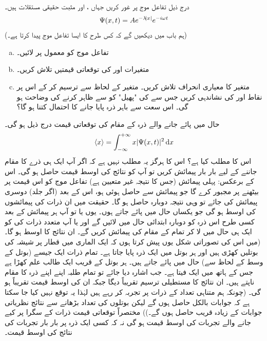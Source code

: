 درج ذیل تفاعل موج پر غور کریں جہاں ،  اور  مثبت حقیقی مستقلات ہیں۔
\begin{align*}
\Psi(x,t)=Ae^{-\lambda\abs{x}}e^{-i\omega t}
\end{align*}
(ہم باب  میں دیکھیں گے کہ کس طرح کا   ایسا تفاعل موج پیدا کرتا ہے۔)
\begin{enumerate}[a.]
\item
تفاعل موج  کو معمول پر لائیں۔
\item
متغیرات  اور  کی توقعاتی قیمتیں تلاش کریں۔
\item
متغیر  کا معیاری انحراف تلاش کریں۔ متغیر  کے لحاظ سے  ترسیم کر کے اس پر  نقاط  اور   کی نشاندہی کریں جس سے  کی "پھیل" کو  سے ظاہر کرنے  کی وضاحت ہو گی۔ اس سعت سے باہر ذرہ پایا جانے کا احتمال کتنا ہو گا؟
\end{enumerate}
 حال  میں پائے جانے والے ذرہ  کے مقام  کی توقعاتی قیمت درج ذیل ہو گی۔
\begin{align}\label{مساوات_تفاعل_موج_معیار_حرکت_توقعاتی_قیمت_تعریف}
\langle x\rangle=\int_{-\infty}^{+\infty}x|\Psi (x,t)|^{2}\dif{x}
\end{align}
اس کا مطلب کیا ہے؟ اس کا  ہرگز یہ مطلب نہیں ہے کہ اگر آپ ایک ہی ذرے کا مقام جاننے کے لیے بار بار پیمائش کریں تو آپ کو نتائج کی اوسط قیمت   حاصل ہو گی۔ اس کے برعکس: پہلی پیمائش (جس کا نتیجہ غیر متعیین ہے) تفاعل موج کو اس قیمت پر بیٹھنے پر مجبور کرے گا جو پیمائش سے حاصل ہوئی ہو، اس کے بعد (اگر جلد) دوسری پیمائش کی جائے تو وہی نتیجہ دوبارہ حاصل ہو گا۔ حقیقت میں 
 ان ذرات کی  پیمائشوں کی اوسط ہو گی جو یکساں حال  میں پائے جاتے ہوں۔ یوں یا تو آپ ہر پیمائش کے بعد کسی طرح اس ذرہ کو دوبارہ ابتدائی حال  میں لائیں گے اور یا آپ متعدد ذرات کی  کو ایک ہی حال   میں لا کر تمام کے مقام کی  پیمائش کریں گے۔ ان نتائج کا اوسط  ہو گا۔ (میں اس کی تصوراتی شکل یوں پیش کرتا ہوں کہ ایک الماری میں  قطار پر شیشہ کی بوتلیں کھڑی ہیں اور ہر بوتل میں ایک ذرہ پایا جاتا ہے۔ تمام ذرات ایک جیسے  (بوتل کے وسط کے لحاظ سے) حال  میں پائے جاتے ہیں۔ ہر بوتل کے قریب ایک طالب علم  کھڑا ہے جس کے ہاتھ میں ایک فیتا  ہے۔ جب اشارہ  دیا جائے تو تمام طلبہ اپنے اپنے ذرہ  کا مقام ناپتے ہیں۔ ان نتائج کا مستطیلی ترسیم تقریباً  دیگا جبکہ ان کی اوسط قیمت تقریباً  ہو گی۔ (چونکہ ہم متناہی تعداد کے ذرات پر تجربہ  کر رہے ہیں لہٰذا  یہ توقع نہیں کیا جا سکتا ہے کہ جوابات بالکل حاصل ہوں گے لیکن بوتلوں  کی تعداد بڑھانے سے نتائج نظریاتی جوابات کے  زیادہ قریب حاصل ہوں گے۔)) مختصراً توقعاتی قیمت ذرات کے  سگرا پر کیے جانے والے تجربات کی اوسط قیمت ہو گی نہ کہ کسی ایک ذرہ پر بار بار تجربات کی نتائج کی اوسط قیمت۔

